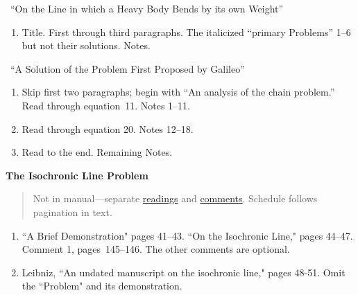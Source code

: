 \documentclass[10pt]{article}
\begin{document}
\ ``On the Line in which a Heavy Body Bends
by its own Weight''
\begin{enumerate}[noitemsep]  \item Title.
		First through third paragraphs. The
		italicized ``primary Problems'' 1--6 but not
		their solutions. Notes.  \end{enumerate} 

\ ``A Solution of the Problem First Proposed by
Galileo'' 
\begin{enumerate}[resume*]
	\item Skip first two paragraphs; begin with ``An analysis of the
	chain problem.'' Read through equation~11. Notes
	1--11. 
\item Read through equation 20. Notes
	12--18. \item Read to the end. Remaining
	Notes.
	\end{enumerate} 
\textbf{The Isochronic Line Problem}
\label{LeibnizIso}
\vspace{-0.2em} 
\begin{quote}
{\small Not in manual---separate \href{https://drive.google.com/file/d/13w3nTIpDN1F0sgImLWWRaLF5vg2cF6BL/view?usp=sharing}{readings} and \href{https://drive.google.com/file/d/140fF6SF7omRfQ-sFkhHiBlaNOiBiNvUq/view?usp=sharing}{comments}. Schedule follows pagination in text.

}
\end{quote}

\vspace{-0.2em}

\begin{enumerate}
\item ``A Brief Demonstration" pages 41--43. ``On the Isochronic Line," pages 44--47.
Comment 1, pages~145--146.  The other comments are optional.

\item Leibniz, ``An undated manuscript on the isochronic line," pages 48-51.
Omit the ``Problem" and its demonstration.
\end{enumerate}
\end{document}

